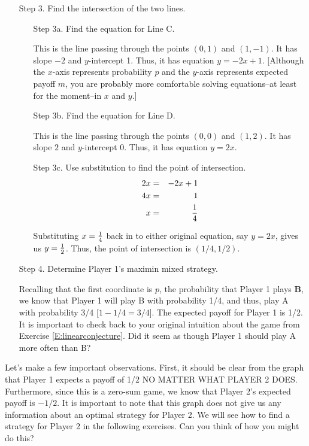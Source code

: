 \begin{itemize}
\item[Step 3.] Find the intersection of the two lines.
\begin{itemize}
\item[Step 3a.] Find the equation for Line C. 

This is the line passing through the points $(0, 1)$ and $(1, -1)$. It has slope $-2$ and $y$-intercept 1. Thus, it has equation $y=-2x+1$. [Although the $x$-axis represents probability $p$ and the $y$-axis represents expected payoff $m$, you are probably more comfortable solving equations--at least for the moment--in $x$ and $y$.]

\item[Step 3b.] Find the equation for Line D. 

This is the line passing through the points $(0, 0)$ and $(1, 2)$. It has slope $2$ and $y$-intercept 0. Thus, it has equation $y=2x$. 
\item[Step 3c.] Use substitution to find the point of intersection. 
\begin{eqnarray*}
2x &=&-2x+1\\
4x &=& 1\\
x&=&{1\over 4}
\end{eqnarray*}

Substituting $x={1\over 4}$ back in to either original equation, say $y=2x$, gives us $y={1\over 2}$. Thus, the point of intersection is $(1/4, 1/2)$. 
\end{itemize}

\item[Step 4.] Determine Player 1's maximin mixed strategy. 

Recalling that the first coordinate is $p$, the probability that Player 1 plays \textbf{B}, we know that Player 1 will play B with probability 1/4, and thus, play A with probability 3/4 [$1-1/4=3/4$]. The expected payoff for Player 1 is 1/2. It is important to check back to your original intuition about the game from Exercise \ref{E:linearconjecture}. Did it seem as though Player 1 should play A more often than B?


\end{itemize}

Let's make a few important observations. First, it should be clear from the graph that Player 1 expects a payoff of 1/2 NO MATTER WHAT PLAYER 2 DOES. Furthermore, since this is a zero-sum game, we know that Player 2's expected payoff is $-1/2$. It is important to note that this graph does not give us any information about an optimal strategy for Player 2. We will see how to find a strategy for Player 2 in the following exercises. Can you think of how you might do this?
